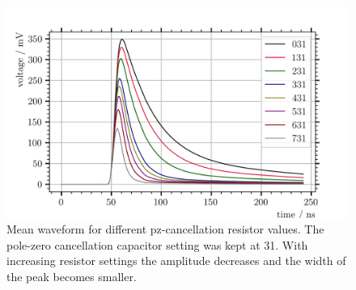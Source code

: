 \begin{figure}
	\centering
	\includegraphics[width=1.\textwidth]{pictures/pz_resistor}
	\caption[Mean waveform for different pz-cancellation resistor values.]{Mean waveform for different pz-cancellation resistor values. The pole-zero cancellation capacitor setting was kept at 31. With increasing resistor settings the amplitude decreases and the width of the peak becomes smaller.}
	\label{fig:pz_resistor}
\end{figure}

